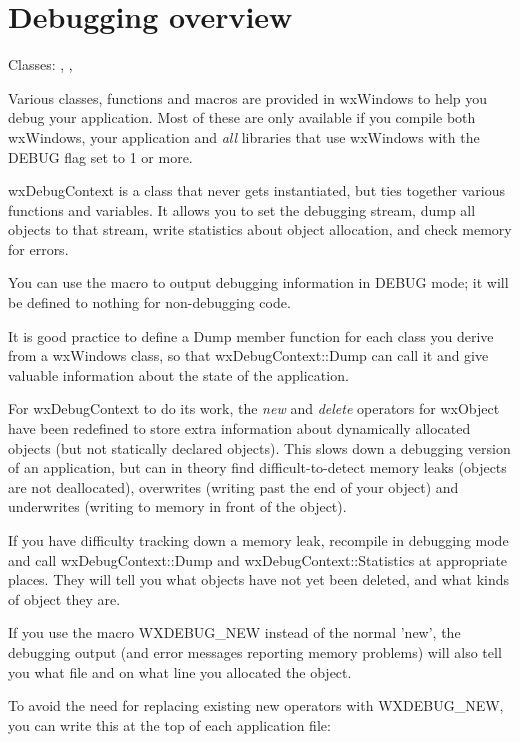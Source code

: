 \section{Debugging overview}\label{debuggingoverview}

Classes: , ,
\rtfsp{}

Various classes, functions and macros are provided in wxWindows to help you debug
your application. Most of these are only available if you compile both wxWindows,
your application and {\it all} libraries that use wxWindows with the DEBUG flag
set to 1 or more.

wxDebugContext is a class that never gets instantiated, but ties together
various functions and variables. It allows you to set the debugging stream, dump
all objects to that stream, write statistics about object allocation, and
check memory for errors.

You can use the  macro to output debugging information in DEBUG mode;
it will be defined to nothing for non-debugging code.

It is good practice to define a Dump member function for each class you derive
from a wxWindows class, so that wxDebugContext::Dump can call it and
give valuable information about the state of the application.

For wxDebugContext to do its work, the {\it new} and {\it delete}\rtfsp
operators for wxObject have been redefined to store extra information
about dynamically allocated objects (but not statically declared
objects). This slows down a debugging version of an application, but can
in theory find difficult-to-detect memory leaks (objects are not
deallocated), overwrites (writing past the end of your object) and
underwrites (writing to memory in front of the object).

If you have difficulty tracking down a memory leak, recompile
in debugging mode and call wxDebugContext::Dump and wxDebugContext::Statistics
at appropriate places. They will tell you what objects have not yet been
deleted, and what kinds of object they are.

If you use the macro WXDEBUG\_NEW instead of the normal 'new', the debugging
output (and error messages reporting memory problems) will also tell you what
file and on what line you allocated the object.

To avoid the need for replacing existing new operators with WXDEBUG\_NEW, you
can write this at the top of each application file:

